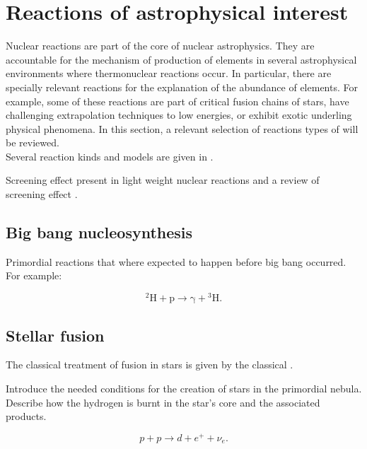 \documentclass[openany]{book}
\begin{document}
\chapter{Reactions of astrophysical interest}  \label{ch:reactionsInterest}

Nuclear reactions are part of the core of nuclear astrophysics. They are accountable for the mechanism of production of elements in several astrophysical environments where thermonuclear reactions occur. In particular, there are specially relevant reactions for the explanation of the abundance of elements. For example, some of these reactions are part of critical fusion chains of stars, have challenging extrapolation techniques to low energies, or  exhibit exotic underling physical phenomena.   In this section, a relevant selection of reactions types of will be reviewed. \\

Several reaction kinds and models are given in \cite{descouvemont_2020}.

Screening effect present in light weight nuclear reactions \cite{raiola_migliardi_gyurky_aliotta_formicola_bonetti_broggini_campajola_corvisiero_costantini_et_2002} and a review of screening effect \cite{assenbaum_langanke_rolfs_1987}.

\section{Big bang nucleosynthesis} \label{sec:BBN}

Primordial reactions that where expected to happen before big bang occurred. For example:

\begin{equation} \label{eq:reaction_2Hpradiative}
	\mathrm{{}^{2}H + p \rightarrow \gamma + {}^{3}H}.
\end{equation}

\section{Stellar fusion}  \label{sec:StellarFusion}

The classical treatment of fusion in stars is given by the classical \cite{burbidge_burbidge_fowler_hoyle_1957}.

Introduce the needed conditions for the creation of stars in the primordial nebula.
Describe how the hydrogen is burnt in the star's core and the associated products. 

\begin{equation} \label{eq:reaction_ppMain}
	p + p \rightarrow d + e^{+} + \nu_e.
\end{equation}
\end{document}
